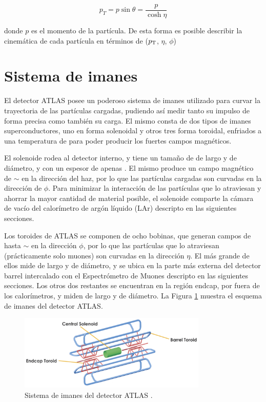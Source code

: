 \begin{equation}
p_{T}=p\sin\theta=\frac{p}{\cosh{\eta}}
\end{equation}

\noindent
donde $p$ es el momento de la partícula. De esta forma es posible describir la cinemática de cada partícula en términos de ($p_{\text{T}}$, $\eta$, $\phi$)

\section{Sistema de imanes}

El detector ATLAS posee un poderoso sistema de imanes \cite{magnet} utilizado para curvar la trayectoria de las partículas cargadas, pudiendo así medir tanto su impulso de forma precisa como también su carga. El mismo consta de dos tipos de imanes superconductores, uno en forma solenoidal y otros tres forma toroidal, enfriados a una temperatura de  para poder producir los fuertes campos magnéticos.

El solenoide rodea al detector interno, y tiene un tamaño de  de largo y  de diámetro, 
y con un espesor de apenas . El mismo produce un campo magnético de $\sim$ en la dirección del haz, por lo que las partículas cargadas son curvadas en la dirección de $\phi$. Para minimizar la interacción de las partículas que lo atraviesan y ahorrar la mayor cantidad de material posible, el solenoide comparte la cámara de vacío del calorímetro de argón líquido (LAr) descripto en las siguientes secciones.

Los toroides de ATLAS se componen de ocho bobinas, que generan campos de hasta $\sim$ en la dirección $\phi$, por lo que las partículas que lo atraviesan (prácticamente solo muones) son curvadas en la dirección $\eta$. El más grande de ellos mide  de largo y  de diámetro, y se ubica en la parte más externa del detector barrel intercalado con el Espectrómetro de Muones descripto en las siguientes secciones. Los otros dos restantes se encuentran en la región endcap, por fuera de los calorímetros, y miden  de largo y  de diámetro. La Figura \ref{fig:magnet_1} muestra el esquema de imanes del detector ATLAS.

\begin{figure}
\centering
  \includegraphics[width=0.8\textwidth]{images/lhc/magnet_1.png}
  \caption{Sistema de imanes del detector ATLAS \cite{magnet_system}.}
  \label{fig:magnet_1}
\end{figure}


